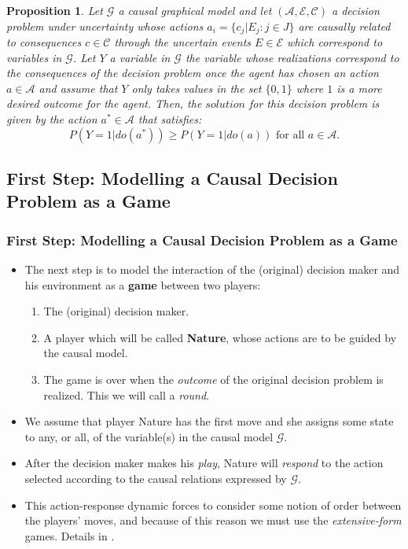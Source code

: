 \documentclass{beamer}
\theoremstyle{plain}
\newtheorem{prop}[teo]{Proposition}
\begin{document}
\begin{frame}
\begin{prop}
Let  $\mathcal{G}$ a causal graphical model and let $(\mathcal{A},\mathcal{E},\mathcal{C})$ a decision problem under uncertainty whose actions $a_i = \{ c_j | E_j : j \in J \}$  are causally related to consequences $c \in \mathcal{C}$ through the uncertain events $E \in \mathcal{E}$ which correspond to variables in $\mathcal{G}$. Let $Y$ a variable in $\mathcal{G}$ the variable whose realizations correspond to the consequences of the decision problem once the agent has chosen an action $a \in \mathcal{A}$ and assume that $Y$ only takes values in the set $\{ 0,1\}$ where $1$ is a more desired outcome for the agent. Then, the $\textit{solution}$ for this decision problem is given by the action $a^\ast \in \mathcal{A}$ that satisfies:
\[ P(Y=1 | do(a^\ast)) \geq P(Y=1 | do(a)) \textrm{ for all } a \in \mathcal{A}. \]
\end{prop}
\end{frame}

\subsection{First Step: Modelling a Causal Decision Problem as a Game}
\begin{frame}
\frametitle{First Step: Modelling a Causal Decision Problem as a Game}
\begin{itemize}
\item The next step is to model the interaction of the (original) decision maker and his environment as a \textbf{game} between two players: 
\begin{enumerate}
\item The (original) decision maker.
\item A player which will be called \textbf{Nature}, whose actions are to be guided by the causal model.
\item The game is over when the \textit{outcome} of the original decision problem is realized. This we will call a \textit{round}.
\end{enumerate}
\end{itemize}
\end{frame}

\begin{frame}
\begin{itemize}
\item  We assume that player Nature has the first move and she assigns some state to any, or all, of the variable(s) in the causal model $\mathcal{G}$.
\item After the decision maker makes his \textit{play}, Nature will \textit{respond} to the action selected according to the causal relations expressed by $\mathcal{G}$.
\item This action-response dynamic forces to consider some notion of order between the players' moves, and because of this reason we must use the \textit{extensive-form} games. Details in \cite{osborne1994course}.
\end{itemize}
\end{frame}
\end{document}
